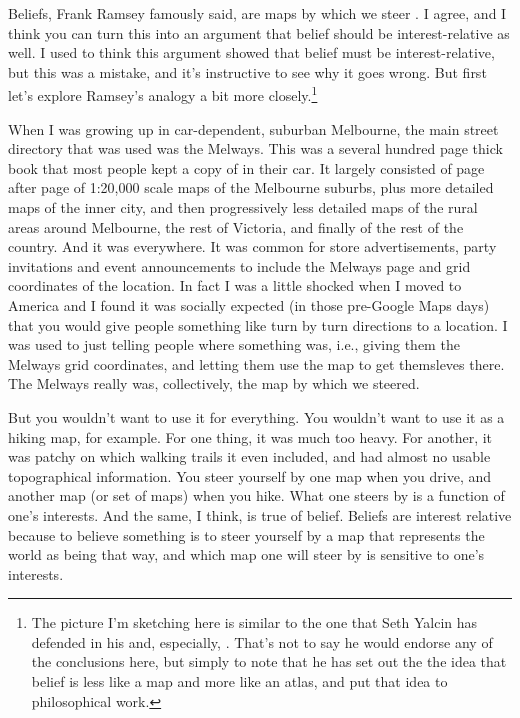 \documentclass[
  11pt,
]{book}
\begin{document}
Beliefs, Frank Ramsey famously said, are maps by which we steer \citep[146]{RamseyGeneralProp}. I agree, and I think you can turn this into an argument that belief should be interest-relative as well. I used to think this argument showed that belief must be interest-relative, but this was a mistake, and it's instructive to see why it goes wrong. But first let's explore Ramsey's analogy a bit more closely.\footnote{The picture I'm sketching here is similar to the one that Seth Yalcin has defended in his \citeyearpar{Yalcin2018} and, especially, \citeyearpar{Yalcin2021}. That's not to say he would endorse any of the conclusions here, but simply to note that he has set out the the idea that belief is less like a map and more like an atlas, and put that idea to philosophical work.}

When I was growing up in car-dependent, suburban Melbourne, the main street directory that was used was the Melways. This was a several hundred page thick book that most people kept a copy of in their car. It largely consisted of page after page of 1:20,000 scale maps of the Melbourne suburbs, plus more detailed maps of the inner city, and then progressively less detailed maps of the rural areas around Melbourne, the rest of Victoria, and finally of the rest of the country. And it was everywhere. It was common for store advertisements, party invitations and event announcements to include the Melways page and grid coordinates of the location. In fact I was a little shocked when I moved to America and I found it was socially expected (in those pre-Google Maps days) that you would give people something like turn by turn directions to a location. I was used to just telling people where something was, i.e., giving them the Melways grid coordinates, and letting them use the map to get themsleves there. The Melways really was, collectively, the map by which we steered.

But you wouldn't want to use it for everything. You wouldn't want to use it as a hiking map, for example. For one thing, it was much too heavy. For another, it was patchy on which walking trails it even included, and had almost no usable topographical information. You steer yourself by one map when you drive, and another map (or set of maps) when you hike. What one steers by is a function of one's interests. And the same, I think, is true of belief. Beliefs are interest relative because to believe something is to steer yourself by a map that represents the world as being that way, and which map one will steer by is sensitive to one's interests.
\end{document}
